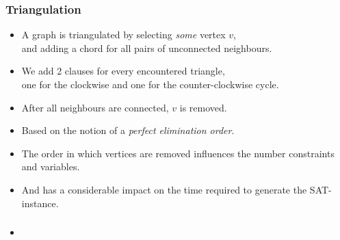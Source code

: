 \documentclass{beamer}
\begin{document}
\begin{frame}
    \frametitle{Triangulation}
    \begin{itemize}
        \item A graph is triangulated by selecting \emph{some} vertex $v$,
            \\and adding a chord for all pairs of unconnected neighbours.
        \item We add 2 clauses for every encountered triangle, \\
                one for the clockwise and one for the counter-clockwise cycle.
        \item After all neighbours are connected, $v$ is removed.
        \item Based on the notion of a \emph{perfect elimination order}.
        \item The order in which vertices are removed influences the number constraints and variables.
        \item And has a considerable impact on the time required to generate the SAT-instance.
    \end{itemize}
\end{frame}\begin{frame}
    \frametitle{}
    \begin{itemize}
        \item
    \end{itemize}
\end{frame}
\end{document}
